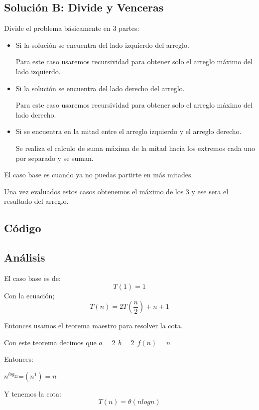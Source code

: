 \documentclass[12pt, fleqn]{article}                             %
\theoremstyle{break}                                            %
\begin{document}
\subsection{Solución B: Divide y Venceras}
Divide el problema básicamente en 3 partes:
\begin{itemize}
    \item Si la solución se encuentra del lado izquierdo del arreglo.

    Para este caso usaremos recursividad para obtener solo el arreglo máximo del lado izquierdo.
    \item Si la solución se encuentra del lado derecho del arreglo.

    Para este caso usaremos recursividad para obtener solo el arreglo máximo del lado derecho.
    \item Si se encuentra en la mitad entre el arreglo izquierdo y el arreglo derecho.

    Se realiza el calculo de suma máxima de la mitad hacia los extremos cada uno por separado y se suman.
\end{itemize}
El caso base es cuando ya no puedas partirte en más mitades.

Una vez evaluados estos casos obtenemos el máximo de los 3 y ese sera el resultado del arreglo.

\subsection{Código}


\subsection{Análisis}
El caso base es de:
\begin{equation*}
    T(1)=1
\end{equation*}
Con la ecuación;
\begin{equation*}
    T(n)=2T(\dfrac{n}{2})+n+1
\end{equation*}

Entonces usamos el teorema maestro para resolver la cota.

Con este teorema decimos que $a=2\:\:b=2\:\:f(n)=n$

Entonces:


$n^{log_22}$=$(n^1)=n$

Y tenemos la cota:
\begin{equation*}
    T(n)=\theta(nlogn)
\end{equation*}
\end{document}
